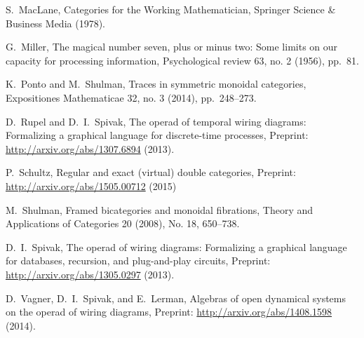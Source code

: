 \documentclass[11pt,oneside,article]{memoir}
\begin{document}
\begin{thebibliography}{XXX}
 S.~MacLane, Categories for the Working Mathematician, Springer Science \& Business Media (1978).

 G.~Miller, The magical number seven, plus or minus two: Some limits on our capacity for processing information, Psychological review 63, no. 2 (1956), pp.~81.

 K.~Ponto and M.~Shulman, Traces in symmetric monoidal categories, Expositiones Mathematicae 32, no. 3 (2014), pp.~248--273.

 D.~Rupel and D.~I.~Spivak, The operad of temporal wiring diagrams: Formalizing a graphical language for discrete-time processes, Preprint: \url{http://arxiv.org/abs/1307.6894} (2013).

 P.~Schultz, Regular and exact (virtual) double categories, Preprint: \url{http://arxiv.org/abs/1505.00712} (2015)
 
 M.~Shulman, Framed bicategories and monoidal fibrations, Theory and Applications of Categories 20 (2008), No. 18, 650--738.
 
 D.~I.~Spivak, The operad of wiring diagrams: Formalizing a graphical language for databases, recursion, and plug-and-play circuits, Preprint: \url{http://arxiv.org/abs/1305.0297} (2013).

 D.~Vagner, D.~I.~Spivak, and E.~Lerman, Algebras of open dynamical systems on the operad of wiring diagrams, Preprint: \url{http://arxiv.org/abs/1408.1598} (2014).

\end{thebibliography}
\end{document}
